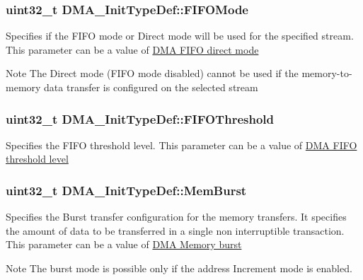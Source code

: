 \subsubsection[{\texorpdfstring{F\+I\+F\+O\+Mode}{FIFOMode}}]{\setlength{\rightskip}{0pt plus 5cm}uint32\+\_\+t D\+M\+A\+\_\+\+Init\+Type\+Def\+::\+F\+I\+F\+O\+Mode}\hypertarget{struct_d_m_a___init_type_def_acda0396cf55baab166f51b1ea1deed0d}{}\label{struct_d_m_a___init_type_def_acda0396cf55baab166f51b1ea1deed0d}
Specifies if the F\+I\+FO mode or Direct mode will be used for the specified stream. This parameter can be a value of \hyperlink{group___d_m_a___f_i_f_o__direct__mode}{D\+MA F\+I\+FO direct mode} \begin{DoxyNote}{Note}
The Direct mode (F\+I\+FO mode disabled) cannot be used if the memory-\/to-\/memory data transfer is configured on the selected stream 
\end{DoxyNote}
\subsubsection[{\texorpdfstring{F\+I\+F\+O\+Threshold}{FIFOThreshold}}]{\setlength{\rightskip}{0pt plus 5cm}uint32\+\_\+t D\+M\+A\+\_\+\+Init\+Type\+Def\+::\+F\+I\+F\+O\+Threshold}\hypertarget{struct_d_m_a___init_type_def_a2f994cc2979b82cd215e9f38edbbc6ed}{}\label{struct_d_m_a___init_type_def_a2f994cc2979b82cd215e9f38edbbc6ed}
Specifies the F\+I\+FO threshold level. This parameter can be a value of \hyperlink{group___d_m_a___f_i_f_o__threshold__level}{D\+MA F\+I\+FO threshold level} 
\subsubsection[{\texorpdfstring{Mem\+Burst}{MemBurst}}]{\setlength{\rightskip}{0pt plus 5cm}uint32\+\_\+t D\+M\+A\+\_\+\+Init\+Type\+Def\+::\+Mem\+Burst}\hypertarget{struct_d_m_a___init_type_def_ad5e266a0b90f58365e21c349654bc68d}{}\label{struct_d_m_a___init_type_def_ad5e266a0b90f58365e21c349654bc68d}
Specifies the Burst transfer configuration for the memory transfers. It specifies the amount of data to be transferred in a single non interruptible transaction. This parameter can be a value of \hyperlink{group___d_m_a___memory__burst}{D\+MA Memory burst} \begin{DoxyNote}{Note}
The burst mode is possible only if the address Increment mode is enabled. 
\end{DoxyNote}
